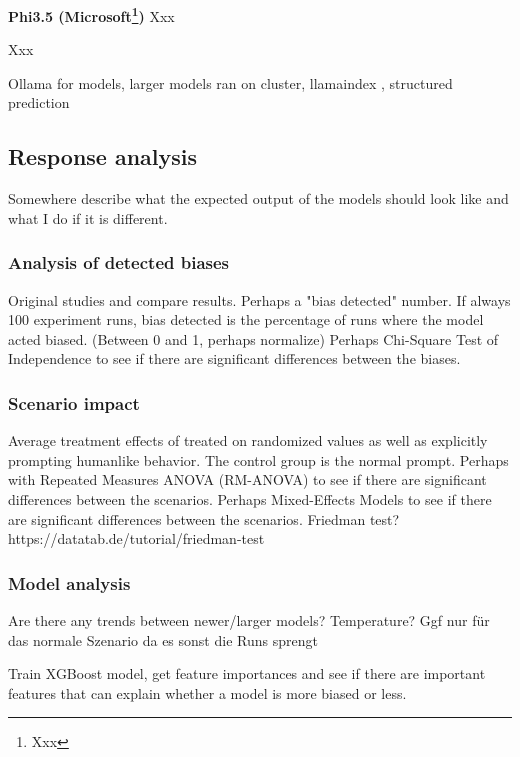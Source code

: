 \par \textbf{Phi3.5 (Microsoft\footnote{Xxx})} Xxx

\setlength{\parindent}{0pt}
\par Xxx

Ollama for models, larger models ran on cluster, llamaindex \parencite{liullamaindex2022}, structured prediction


\subsection{Response analysis}
Somewhere describe what the expected output of the models should look like and what I do if it is different.

\subsubsection{Analysis of detected biases}
Original studies and compare results. Perhaps a "bias detected" number. If always 100 experiment runs, bias detected is the percentage of runs where the model acted biased. (Between 0 and 1, perhaps normalize)
Perhaps Chi-Square Test of Independence to see if there are significant differences between the biases.

\subsubsection{Scenario impact}
Average treatment effects of treated on randomized values as well as explicitly prompting humanlike behavior. The control group is the normal prompt.
Perhaps with Repeated Measures ANOVA (RM-ANOVA) to see if there are significant differences between the scenarios.
Perhaps Mixed-Effects Models to see if there are significant differences between the scenarios.
Friedman test? https://datatab.de/tutorial/friedman-test

\subsubsection{Model analysis}
Are there any trends between newer/larger models?
Temperature? Ggf nur für das normale Szenario da es sonst die Runs sprengt

Train XGBoost model, get feature importances and see if there are important features that can explain whether a model is more biased or less.